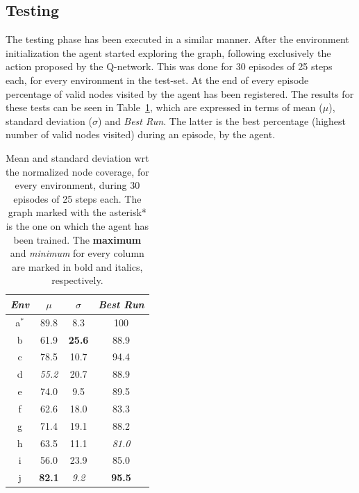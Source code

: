 \documentclass[a4paper]{article}
\begin{document}
\subsection{Testing}

The testing phase has been executed in a similar manner. After the environment initialization the agent started exploring the graph, following exclusively the action proposed by the Q-network. This was done for 30 episodes of 25 steps each, for every environment in the test-set. At the end of every episode percentage of valid nodes visited by the agent has been registered. The results for these tests can be seen in Table~\ref{tab:res}, which are expressed in terms of mean ($\mu$), standard deviation ($\sigma$) and \textit{Best Run}. The latter is the best percentage (highest number of valid nodes visited) during an episode, by the agent.

\begin{table}[h]
\begin{tabular}{cccc}
\toprule
\textit{Env} & $\mu$ & $\sigma$  & \textit{Best Run} \\
\midrule
a$^*$   & 89.8 & 8.3  & 100      \\
b   & 61.9 & \textbf{25.6} & 88.9     \\
c   & 78.5 & 10.7 & 94.4     \\
d   & \textit{55.2} & 20.7 & 88.9     \\
e   & 74.0 & 9.5  & 89.5     \\
f   & 62.6 & 18.0 & 83.3     \\
g   & 71.4 & 19.1 & 88.2     \\
h   & 63.5 & 11.1 & \textit{81.0}     \\
i   & 56.0 & 23.9 & 85.0     \\
j   & \textbf{82.1} & \textit{9.2}  & \textbf{95.5}    \\
\bottomrule
\end{tabular}
\caption{Mean and standard deviation wrt the normalized node coverage, for every environment, during 30 episodes of 25 steps each. The graph marked with the asterisk* is the one on which the agent has been trained. The \textbf{maximum} and \textit{minimum} for every column are marked in bold and italics, respectively.}
\label{tab:res}
\end{table}
\end{document}
